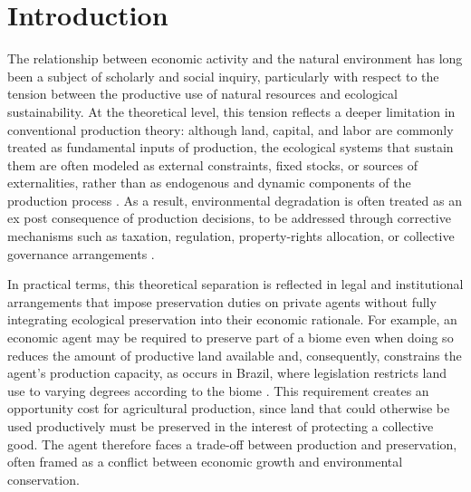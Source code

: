 \section{Introduction}

The relationship between economic activity and the natural environment has long been a subject of scholarly and social inquiry, particularly with respect to the tension between the productive use of natural resources and ecological sustainability. At the theoretical level, this tension reflects a deeper limitation in conventional production theory: although land, capital, and labor are commonly treated as fundamental inputs of production, the ecological systems that sustain them are often modeled as external constraints, fixed stocks, or sources of externalities, rather than as endogenous and dynamic components of the production process \cite{jehle2011, stiglitz1989reflections, dasgupta2001human}. As a result, environmental degradation is often treated as an ex post consequence of production decisions, to be addressed through corrective mechanisms such as taxation, regulation, property-rights allocation, or collective governance arrangements \cite{pigou2010liberty, hardin1968tragedy, ostrom2002commonpool}.

In practical terms, this theoretical separation is reflected in legal and institutional arrangements that impose preservation duties on private agents without fully integrating ecological preservation into their economic rationale. For example, an economic agent may be required to preserve part of a biome even when doing so reduces the amount of productive land available and, consequently, constrains the agent’s production capacity, as occurs in Brazil, where legislation restricts land use to varying degrees according to the biome \cite{brasil2012florestal}. This requirement creates an opportunity cost for agricultural production, since land that could otherwise be used productively must be preserved in the interest of protecting a collective good. The agent therefore faces a trade-off between production and preservation, often framed as a conflict between economic growth and environmental conservation.

